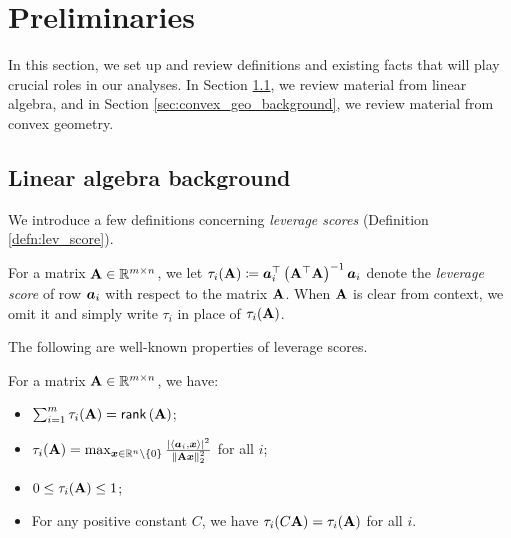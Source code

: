 \documentclass[11pt]{article}
\numberwithin{equation}{section}
\begin{document}
\section{Preliminaries}
\label{sec:background}

In this section, we set up and review definitions and existing facts that will play crucial roles in our analyses. In Section \ref{sec:linalg_background}, we review material from linear algebra, and in Section \ref{sec:convex_geo_background}, we review material from convex geometry.

\subsection{Linear algebra background}
\label{sec:linalg_background}

We introduce a few definitions concerning \textit{leverage scores} (Definition \ref{defn:lev_score}). 
\begin{definition}
\label{defn:lev_score}
For a matrix $\mathbf{A} \in \mathbb{R}^{m\times n}$, we let $\tau_i(\mathbf{A}) \coloneqq \bm{a}_i^{\top}\left(\mathbf{A}^{\top}\mathbf{A}\right)^{-1}\bm{a}_i$ denote the \textit{leverage score} of row $\bm{a}_i$ with respect to the matrix $\mathbf{A}$. When $\mathbf{A}$ is clear from context, we omit it and simply write $\tau_i$ in place of $\tau_i(\mathbf{A})$.
\end{definition}

The following are well-known properties of leverage scores.

\begin{fact}
\label{fact:lev_score_facts}
For a matrix $\mathbf{A} \in \mathbb{R}^{m\times n}$, we have:
\begin{itemize}
    \item $\sum_{i=1}^m \tau_i(\mathbf{A}) = \mathsf{rank}\left(\mathbf{A}\right)$;
    \item $\tau_i(\mathbf{A}) = \max_{\bm{x}\in\mathbb{R}^n\setminus\left\{0\right\}} \frac{\left\lvert \left\langle \bm{a}_i,\bm{x} \right\rangle \right\rvert^2}{\left\lVert \mathbf{A}\bm{x} \right\rVert_2^2}$ for all $i$;
    \item $0 \le \tau_i(\mathbf{A}) \le 1$;
    \item For any positive constant $C$, we have $\tau_i(C\mathbf{A}) = \tau_i(\mathbf{A})$ for all $i$.
\end{itemize}
\end{fact}
\end{document}
